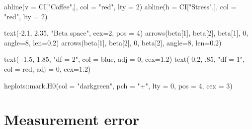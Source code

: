 \documentclass[
  letterpaper,
  10pt,
  krantz2]{krantz}
\makeatletter
\newenvironment{Shaded}{\begin{snugshade}}{\end{snugshade}}
\newcommand{\AttributeTok}[1]{\textcolor[rgb]{0.40,0.45,0.13}{#1}}
\newcommand{\DecValTok}[1]{\textcolor[rgb]{0.68,0.00,0.00}{#1}}
\newcommand{\FloatTok}[1]{\textcolor[rgb]{0.68,0.00,0.00}{#1}}
\newcommand{\FunctionTok}[1]{\textcolor[rgb]{0.28,0.35,0.67}{#1}}
\newcommand{\NormalTok}[1]{\textcolor[rgb]{0.00,0.23,0.31}{#1}}
\newcommand{\SpecialCharTok}[1]{\textcolor[rgb]{0.37,0.37,0.37}{#1}}
\newcommand{\StringTok}[1]{\textcolor[rgb]{0.13,0.47,0.30}{#1}}
\newenvironment{kframe}{%
  \medskip{}
  \setlength{\fboxsep}{.8em}
  \def\at@end@of@kframe{}%
  \ifinner\ifhmode%
  \def\at@end@of@kframe{\end{minipage}}%
  \begin{minipage}{\columnwidth}%
  \fi\fi%
  \def\FrameCommand##1{\hskip\@totalleftmargin \hskip-\fboxsep
  \colorbox{shadecolor}{##1}\hskip-\fboxsep
      \hskip-\linewidth \hskip-\@totalleftmargin \hskip\columnwidth}%
  \MakeFramed {\advance\hsize-\width
    \@totalleftmargin\z@ \linewidth\hsize
    \@setminipage}}%
{\par\unskip\endMakeFramed%
  \at@end@of@kframe}
\renewenvironment{Shaded}{\begin{kframe}}{\end{kframe}}
\makeatother
\begin{document}
\begin{Shaded}
\begin{Highlighting}[]
\FunctionTok{abline}\NormalTok{(}\AttributeTok{v =}\NormalTok{ CI[}\StringTok{"Coffee"}\NormalTok{,], }\AttributeTok{col =} \StringTok{"red"}\NormalTok{, }\AttributeTok{lty =} \DecValTok{2}\NormalTok{)}
\FunctionTok{abline}\NormalTok{(}\AttributeTok{h =}\NormalTok{ CI[}\StringTok{"Stress"}\NormalTok{,], }\AttributeTok{col =} \StringTok{"red"}\NormalTok{, }\AttributeTok{lty =} \DecValTok{2}\NormalTok{)}

\FunctionTok{text}\NormalTok{(}\SpecialCharTok{{-}}\FloatTok{2.1}\NormalTok{, }\FloatTok{2.35}\NormalTok{, }\StringTok{"Beta space"}\NormalTok{, }\AttributeTok{cex=}\DecValTok{2}\NormalTok{, }\AttributeTok{pos =} \DecValTok{4}\NormalTok{)}
\FunctionTok{arrows}\NormalTok{(beta[}\DecValTok{1}\NormalTok{], beta[}\DecValTok{2}\NormalTok{], beta[}\DecValTok{1}\NormalTok{], }\DecValTok{0}\NormalTok{, }\AttributeTok{angle=}\DecValTok{8}\NormalTok{, }\AttributeTok{len=}\FloatTok{0.2}\NormalTok{)}
\FunctionTok{arrows}\NormalTok{(beta[}\DecValTok{1}\NormalTok{], beta[}\DecValTok{2}\NormalTok{], }\DecValTok{0}\NormalTok{, beta[}\DecValTok{2}\NormalTok{], }\AttributeTok{angle=}\DecValTok{8}\NormalTok{, }\AttributeTok{len=}\FloatTok{0.2}\NormalTok{)}

\FunctionTok{text}\NormalTok{( }\SpecialCharTok{{-}}\FloatTok{1.5}\NormalTok{, }\FloatTok{1.85}\NormalTok{, }\StringTok{"df = 2"}\NormalTok{, }\AttributeTok{col =} \StringTok{\textquotesingle{}blue\textquotesingle{}}\NormalTok{, }\AttributeTok{adj =} \DecValTok{0}\NormalTok{, }\AttributeTok{cex=}\FloatTok{1.2}\NormalTok{)}
\FunctionTok{text}\NormalTok{( }\FloatTok{0.2}\NormalTok{, .}\DecValTok{85}\NormalTok{, }\StringTok{"df = 1"}\NormalTok{, }\AttributeTok{col =} \StringTok{\textquotesingle{}red\textquotesingle{}}\NormalTok{, }\AttributeTok{adj =} \DecValTok{0}\NormalTok{, }\AttributeTok{cex=}\FloatTok{1.2}\NormalTok{)}

\NormalTok{heplots}\SpecialCharTok{::}\FunctionTok{mark.H0}\NormalTok{(}\AttributeTok{col =} \StringTok{"darkgreen"}\NormalTok{, }\AttributeTok{pch =} \StringTok{"+"}\NormalTok{, }\AttributeTok{lty =} \DecValTok{0}\NormalTok{, }\AttributeTok{pos =} \DecValTok{4}\NormalTok{, }\AttributeTok{cex =} \DecValTok{3}\NormalTok{)}
\end{Highlighting}
\end{Shaded}

\section{Measurement error}\label{measurement-error}
\end{document}

